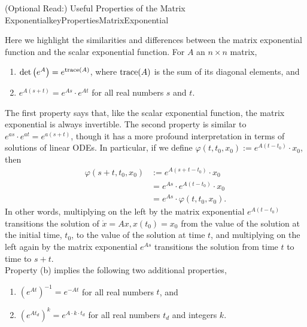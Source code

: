 \bigskip

\begin{propColor}{(Optional Read:) Useful Properties of the Matrix Exponential}{keyPropertiesMatrixExponential}

Here we highlight the similarities and differences between the matrix exponential function and the scalar exponential function. For $A$ an $n \times n $ matrix,
 \begin{enumerate}
\renewcommand{\labelenumi}{(\alph{enumi})}
\setlength{\itemsep}{.2cm}
    \item $\det\left(e^{A}\right) = e^{\mathrm{trace}(A)}$, where $\mathrm{trace}(A)$ is the sum of its diagonal elements, and
    \item $e^{A (s+t)} = e^{A s}  \cdot e^{A t} $ for all real numbers $s$ and $t$.
\end{enumerate}
The first property says that, like the scalar exponential function, the matrix exponential is always invertible. The second property is similar to $e^{as} \cdot e^{at} = e^{a(s + t)}$, though it has a more profound interpretation in terms of solutions of linear ODEs. In particular, if we define $\varphi(t, t_0, x_0):=e^{A(t-t_0)} \cdot x_0$, then
\begin{align*}
\varphi(s+t, t_0, x_0) &:=e^{A (s+t-t_0)} \cdot x_0 \\
& =  e^{A s} \cdot e^{A (t-t_0)} \cdot x_0 \\
&= e^{A s} \cdot \varphi(t,  t_0, x_0). 
\end{align*}
In other words, multiplying on the left by the matrix exponential $e^{A (t-t_0)}$ transitions the solution of $\dot{x} = Ax, x(t_0)=x_0$ from the value of the solution at the initial time, $t_0$, to the value of the solution at time $t$, and multiplying on the left again by the matrix exponential $e^{A s}$ transitions the solution from time $t$ to time to $s+t$. \\

Property (b) implies the following two additional properties,
\bigskip
 \begin{enumerate}
\renewcommand{\labelenumi}{(\alph{enumi})}
\setlength{\itemsep}{.2cm}
\setcounter{enumi}{2}
 \item $\left(e^{A t}\right)^{-1} = e^{-A t}  $ for all real numbers $t$, and
    \item $\left(e^{A t_d}\right)^k = e^{A \cdot k \cdot t_d}  $ for all real numbers $t_d$ and integers $k$.
    \end{enumerate} 

\bigskip


\end{propColor}
